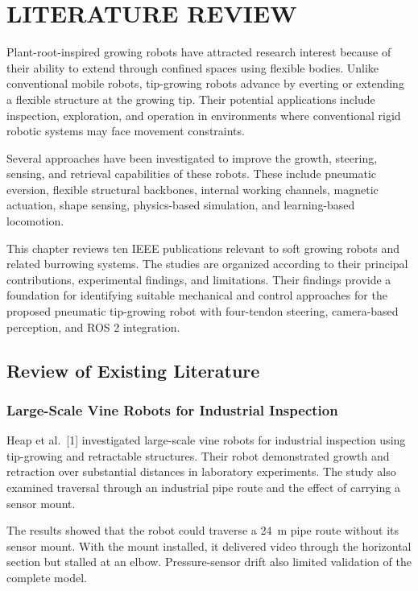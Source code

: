 \chapter{LITERATURE REVIEW}

Plant-root-inspired growing robots have attracted research interest because of their ability to extend through confined spaces using flexible bodies. Unlike conventional mobile robots, tip-growing robots advance by everting or extending a flexible structure at the growing tip. Their potential applications include inspection, exploration, and operation in environments where conventional rigid robotic systems may face movement constraints.

Several approaches have been investigated to improve the growth, steering, sensing, and retrieval capabilities of these robots. These include pneumatic eversion, flexible structural backbones, internal working channels, magnetic actuation, shape sensing, physics-based simulation, and learning-based locomotion.

This chapter reviews ten IEEE publications relevant to soft growing robots and related burrowing systems. The studies are organized according to their principal contributions, experimental findings, and limitations. Their findings provide a foundation for identifying suitable mechanical and control approaches for the proposed pneumatic tip-growing robot with four-tendon steering, camera-based perception, and ROS 2 integration.

\section{Review of Existing Literature}

\subsection{Large-Scale Vine Robots for Industrial Inspection}

Heap et al.~[1] investigated large-scale vine robots for industrial inspection using tip-growing and retractable structures. Their robot demonstrated growth and retraction over substantial distances in laboratory experiments. The study also examined traversal through an industrial pipe route and the effect of carrying a sensor mount.

The results showed that the robot could traverse a 24~m pipe route without its sensor mount. With the mount installed, it delivered video through the horizontal section but stalled at an elbow. Pressure-sensor drift also limited validation of the complete model.


